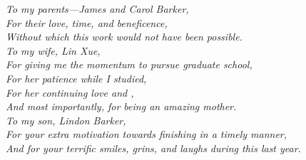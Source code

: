 \documentclass[phd,tocprelim]{cornell}
\begin{document}
\begin{dedication}
\begin{center}
\textit{To my parents---James and Carol Barker, \\
For their love, time, and beneficence, \\
Without which this work would not have been possible. \\
\vspace{10 mm} 
To my wife, Lin Xue, \\
For giving me the momentum to pursue graduate school, \\
For her patience while I studied, \\
For her continuing love and , \\
And most importantly, for being an amazing mother.\\
\vspace{10 mm} 
To my son, Lindon Barker, \\
For your extra motivation towards finishing in a timely manner, \\
And for your terrific smiles, grins, and laughs during this last year.}
\end{center}
\end{dedication}
\end{document}
